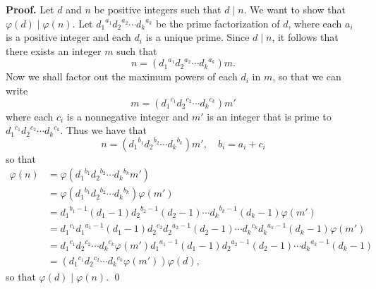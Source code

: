 \begin{enumerate}
      \textbf{Proof.} Let $d$ and $n$ be positive integers such that $d \mid n$.
      We want to show that $\varphi(d) \mid \varphi(n)$. Let
      ${d_1}^{a_1}{d_2}^{a_2}\cdots{d_k}^{a_k}$ be the prime factorization of
      $d$, where each $a_i$ is a positive integer and each $d_i$ is a unique
      prime. Since $d \mid n$, it follows that there exists an integer $m$ such
      that
      $$n = ({d_1}^{a_1}{d_2}^{a_2}\cdots{d_k}^{a_k})m.$$
      Now we shall factor out the maximum powers of each $d_i$ in $m$, so that 
      we can write
      $$m = ({d_1}^{c_1}{d_2}^{c_2}\cdots{d_k}^{c_k})m'$$
      where each $c_i$ is a nonnegative integer and $m'$ is an integer that is
      prime to ${d_1}^{c_1}{d_2}^{c_2}\cdots{d_k}^{c_k}$. Thus we have that
      $$n = ({d_1}^{b_1}{d_2}^{b_2}\cdots{d_k}^{b_k})m', \quad b_i = a_i + c_i$$
      so that
      \begin{align*}
         \varphi(n) &= \varphi({d_1}^{b_1}{d_2}^{b_2}\cdots{d_k}^{b_k}m') \\
                    &= \varphi({d_1}^{b_1}{d_2}^{b_2}\cdots{d_k}^{b_k})
                       \varphi(m') \\
                    &= {d_1}^{b_1 - 1}(d_1 - 1){d_2}^{b_2 - 1}(d_2 - 1)\cdots
                       {d_k}^{b_k - 1}(d_k - 1)\varphi(m') \\
                    &= {d_1}^{c_1}{d_1}^{a_1 - 1}(d_1 - 1)
                       {d_2}^{c_2}{d_2}^{a_2 - 1}(d_2 - 1)\cdots
                       {d_k}^{c_k}{d_k}^{a_k - 1}(d_k - 1)\varphi(m')\\
                    &= {d_1}^{c_1}{d_2}^{c_2}\cdots{d_k}^{c_k}\varphi(m')
                       {d_1}^{a_1 - 1}(d_1 - 1)
                       {d_2}^{a_2 - 1}(d_2 - 1)\cdots
                       {d_k}^{a_k - 1}(d_k - 1) \\
                    &= ({d_1}^{c_1}{d_2}^{c_2}\cdots{d_k}^{c_k}
                        \varphi(m'))\varphi(d),
      \end{align*}
      so that $\varphi(d) \mid \varphi(n)$. \qed
      
\end{enumerate}
